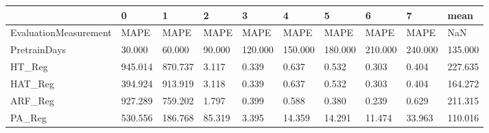 \begin{tabular}{llllllllll}
\toprule
{} &       0 &       1 &      2 &       3 &       4 &       5 &       6 &       7 &    mean \\
\midrule
EvaluationMeasurement &    MAPE &    MAPE &   MAPE &    MAPE &    MAPE &    MAPE &    MAPE &    MAPE &     NaN \\
PretrainDays          &  30.000 &  60.000 & 90.000 & 120.000 & 150.000 & 180.000 & 210.000 & 240.000 & 135.000 \\
HT\_Reg                & 945.014 & 870.737 &  3.117 &   0.339 &   0.637 &   0.532 &   0.303 &   0.404 & 227.635 \\
HAT\_Reg               & 394.924 & 913.919 &  3.118 &   0.339 &   0.637 &   0.532 &   0.303 &   0.404 & 164.272 \\
ARF\_Reg               & 927.289 & 759.202 &  1.797 &   0.399 &   0.588 &   0.380 &   0.239 &   0.629 & 211.315 \\
PA\_Reg                & 530.556 & 186.768 & 85.319 &   3.395 &  14.359 &  14.291 &  11.474 &  33.963 & 110.016 \\
\bottomrule
\end{tabular}
